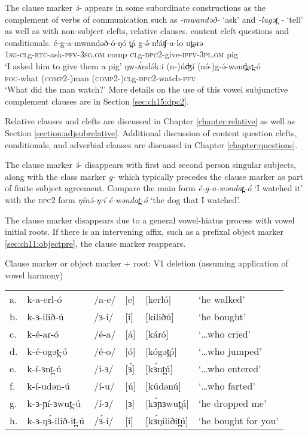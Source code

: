 The clause marker \textit{ ə́- } appears in some subordinate constructions as the complement of verbs of communication such as \textit{-mwandəð-} ‘ask’ and \textit{-lugət̪ -} ‘tell’  as well as with non-subject clefts, relative clauses, content cleft questions  and conditionals.
\ea 
\ea \gll  	é-g-a-mwandəð-ó-ŋó            t̪á      g-ə́-n!áʧ-a-lo                          ut̪əɾə\\
  	 1\textsc{sg}-\textsc{cl}g-\textsc{rtc}-ask-\textsc{pfv}-3\textsc{sg.om}  comp \textsc{cl}g-\textsc{dpc2}-give-\textsc{ipfv}-3\textsc{pl.om}   pig\\
	\glt  ‘I asked him to give them a pig’ \label{ex:ch11:dpc2a}
\ex \gll 	ŋw-ʌ́ndə́k:i       (n-)úʤí           (nə́-)g-ə́-wənd̪at̪-ó                \\         
		\textsc{foc}-what      (\textsc{comp2}-)man     (\textsc{comp2}-)\textsc{cl}g-\textsc{dpc2}-watch-\textsc{pfv}   \\
	\glt ‘What did the man watch?’ \label{ex:ch11:dpc2b}
\z
\z
More details on the use of this vowel subjunctive complement clauses are in Section \ref{sec:ch15:dpc2}. 

Relative clauses and clefts are discussed in Chapter \ref{chapter:relative} as well as Section \ref{section:adjsubrelative}. Additional discussion of content question clefts, conditionals, and adverbial clauses are discussed in Chapter \ref{chapter:questions}.

The clause marker \textit{ə́-} disappears with first and second person singular subjects, along with the class marker \textit{g-} which typically precedes the clause marker as part of finite subject agreement. Compare the main form \textit{é-g-a-wəndat̪-ó } ‘I watched it’ with the \textsc{dpc2} form \textit{ŋínə́-ŋ:í é-wəndat̪-ó } ‘the dog that I watched’.


The clause marker disappears due to a general vowel-hiatus process with vowel initial roots. If there is an intervening affix, such as a prefixal object marker \ref{sec:ch11:objectpre}, the clause marker reappears.

\ea Clause marker or object marker + root: V1 deletion (assuming application of vowel harmony) \label{ex:ch11:clausevhiatus}
\begin{tabular}[t]{llllll}
a.&	k-a-erl-ó	&	/a-e/	&	[e]	&	[kerló]	&	‘he walked’\\
b.&	k-ɜ-ilið-ú	&	/ɜ-i/	&	[i]	&	[kiliðú]	&	‘he bought’\\
c.&	k-é-aɾ-ó	&	/é-a/	&	[á]	&	[káɾó]	&	‘…who cried’	 \\
d.&	k-é-ogət̪-ó	&	/é-o/	&	[ó]	&	[kógət̪ó]&	‘…who jumped’\\
e.&	k-í-ɜnt̪-ú	&	/í-ɜ/	&	[ɜ́]	&	[kɜ́nt̪ú]	&	‘…who entered’\\
f.&	k-í-udən-ú	&	/í-u/	&	[ú]	&	[kúdənú]	&	‘…who farted’\\
g.&	k-ɜ-ɲí-ɜwut̪-ú&	/í-ɜ/	&	[ɜ]	&	[kɜ́ɲɜwut̪ú]&	‘he dropped me’\\
h.&	k-ɜ-ŋɜ́-ilið-it̪-ú&/ɜ́-i/	&	[i]	&	[kɜ́ŋiliðit̪ú]&	‘he bought for you’\\
\end{tabular}
\z 


